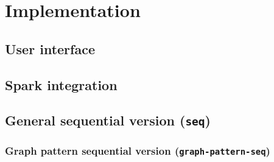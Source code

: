 \section{Implementation} \label{sec:implementation}

\subsection{User interface}

\subsection{Spark integration}

\subsection{General sequential version (\texttt{seq})}

\subsubsection{Graph pattern sequential version (\texttt{graph-pattern-seq})}
